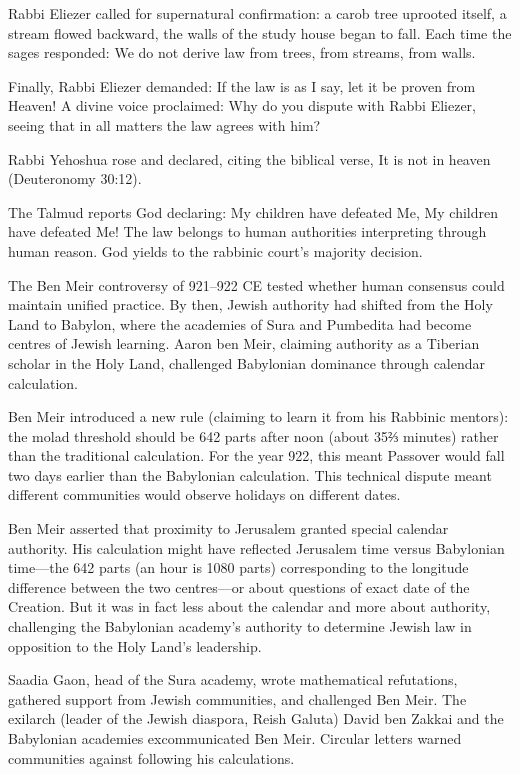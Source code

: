 Rabbi Eliezer called for supernatural confirmation: a carob tree uprooted itself, a stream flowed backward, the walls of the study house began to fall. Each time the sages responded: \QENOpen{}We do not derive law from trees, from streams, from walls.\QENClose{}

Finally, Rabbi Eliezer demanded: \QENOpen{}If the law is as I say, let it be proven from Heaven!\QENClose{} A divine voice proclaimed: \QENOpen{}Why do you dispute with Rabbi Eliezer, seeing that in all matters the law agrees with him?\QENClose{}

Rabbi Yehoshua rose and declared, citing the biblical verse, \QENOpen{}It is not in heaven\QENClose{} (Deuteronomy 30:12).

The Talmud reports God declaring: \QENOpen{}My children have defeated Me, My children have defeated Me!\QENClose{} The law belongs to human authorities interpreting through human reason. God yields to the rabbinic court's majority decision.

The Ben Meir controversy of 921–922 CE tested whether human consensus could maintain unified practice. By then, Jewish authority had shifted from the Holy Land to Babylon, where the academies of Sura and Pumbedita had become centres of Jewish learning. Aaron ben Meir, claiming authority as a Tiberian scholar in the Holy Land, challenged Babylonian dominance through calendar calculation.

Ben Meir introduced a new rule (claiming to learn it from his Rabbinic mentors): the molad threshold should be 642 parts after noon (about 35⅔ minutes) rather than the traditional calculation. For the year 922, this meant Passover would fall two days earlier than the Babylonian calculation. This technical dispute meant different communities would observe holidays on different dates.

Ben Meir asserted that proximity to Jerusalem granted special calendar authority. His calculation might have reflected Jerusalem time versus Babylonian time—the 642 parts (an hour is 1080 parts) corresponding to the longitude difference between the two centres—or about questions of exact date of the Creation. But it was in fact less about the calendar and more about authority, challenging the Babylonian academy's authority to determine Jewish law in opposition to the Holy Land's leadership.

Saadia Gaon, head of the Sura academy, wrote mathematical refutations, gathered support from Jewish communities, and challenged Ben Meir. The exilarch (leader of the Jewish diaspora, Reish Galuta) David ben Zakkai and the Babylonian academies excommunicated Ben Meir. Circular letters warned communities against following his calculations.

